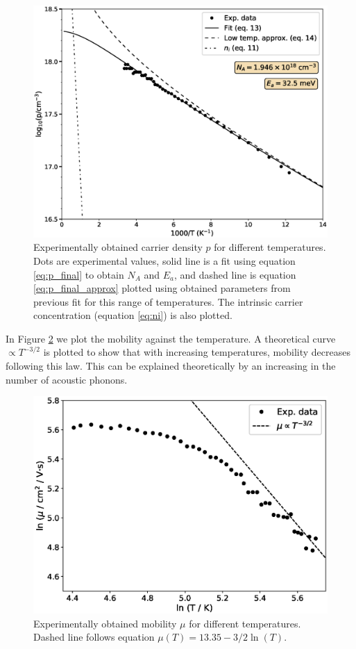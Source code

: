 \documentclass[11pt,a4paper]{article}
\begin{document}
\begin{figure}[H]
\centering
\includegraphics[width=.9\textwidth]{carrier_density.eps}
\caption{Experimentally obtained carrier density $p$ for different temperatures. Dots are experimental values, solid line is a fit using equation \eqref{eq:p_final} to obtain $N_A$ and $E_a$, and dashed line is equation \eqref{eq:p_final_approx} plotted using obtained parameters from previous fit for this range of temperatures. The intrinsic carrier concentration (equation \eqref{eq:ni}) is also plotted.}
\label{fig:carrier_density}
\end{figure}

In Figure \ref{fig:hall_mobility} we plot the mobility against the temperature. A theoretical curve $\propto T^{-3/2}$ is plotted to show that with increasing temperatures, mobility decreases following this law. This can be explained theoretically by an increasing in the number of acoustic phonons.

\begin{figure}[H]
\centering
\includegraphics[width=.9\textwidth]{Hall_mobility.eps}
\caption{Experimentally obtained mobility $\mu$ for different temperatures. Dashed line follows equation $\mu(T)=13.35 -3/2\ln(T)$.}
\label{fig:hall_mobility}
\end{figure}
\end{document}
